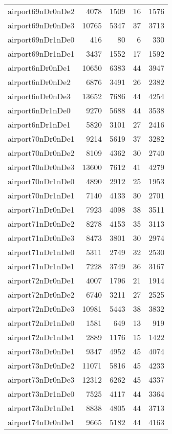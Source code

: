 \begin{longtable}{lrrrr}
airport69nDr0nDe2 & 4078 & 1509 & 16 & 1576 \\
airport69nDr0nDe3 & 10765 & 5347 & 37 & 3713 \\
airport69nDr1nDe0 & 416 & 80 & 6 & 330 \\
airport69nDr1nDe1 & 3437 & 1552 & 17 & 1592 \\
airport6nDr0nDe1 & 10650 & 6383 & 44 & 3947 \\
airport6nDr0nDe2 & 6876 & 3491 & 26 & 2382 \\
airport6nDr0nDe3 & 13652 & 7686 & 44 & 4254 \\
airport6nDr1nDe0 & 9270 & 5688 & 44 & 3538 \\
airport6nDr1nDe1 & 5820 & 3101 & 27 & 2416 \\
airport70nDr0nDe1 & 9214 & 5619 & 37 & 3282 \\
airport70nDr0nDe2 & 8109 & 4362 & 30 & 2740 \\
airport70nDr0nDe3 & 13600 & 7612 & 41 & 4279 \\
airport70nDr1nDe0 & 4890 & 2912 & 25 & 1953 \\
airport70nDr1nDe1 & 7140 & 4133 & 30 & 2701 \\
airport71nDr0nDe1 & 7923 & 4098 & 38 & 3511 \\
airport71nDr0nDe2 & 8278 & 4153 & 35 & 3113 \\
airport71nDr0nDe3 & 8473 & 3801 & 30 & 2974 \\
airport71nDr1nDe0 & 5311 & 2749 & 32 & 2530 \\
airport71nDr1nDe1 & 7228 & 3749 & 36 & 3167 \\
airport72nDr0nDe1 & 4007 & 1796 & 21 & 1914 \\
airport72nDr0nDe2 & 6740 & 3211 & 27 & 2525 \\
airport72nDr0nDe3 & 10981 & 5443 & 38 & 3832 \\
airport72nDr1nDe0 & 1581 & 649 & 13 & 919 \\
airport72nDr1nDe1 & 2889 & 1176 & 15 & 1422 \\
airport73nDr0nDe1 & 9347 & 4952 & 45 & 4074 \\
airport73nDr0nDe2 & 11071 & 5816 & 45 & 4233 \\
airport73nDr0nDe3 & 12312 & 6262 & 45 & 4337 \\
airport73nDr1nDe0 & 7525 & 4117 & 44 & 3364 \\
airport73nDr1nDe1 & 8838 & 4805 & 44 & 3713 \\
airport74nDr0nDe1 & 9665 & 5182 & 44 & 4163 \\

\end{longtable}
